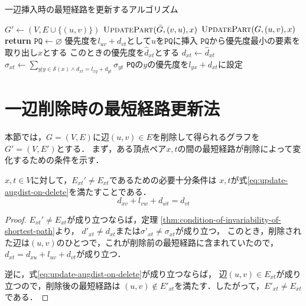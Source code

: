\begin{algorithm}[tbp]
  \caption{一辺挿入時の最短経路を更新するアルゴリズム}
  \label{alg:incremental-algorithm}
  \begin{multicols}{2}
    \begin{algorithmic}[1]\small
      \State $G'\gets (V,E\cup\{(u,v)\})$
      \State $\textproc{UpdatePart}(\bar{G},(v,u),x)$
      \EndFor
      \State $\textproc{UpdatePart}(G,(u,v),x)$
      \EndFor
      \EndProcedure
      \vfill\null
      \columnbreak
      \State \textbf{return}
      \EndIf
      \State $\texttt{PQ}\gets\varnothing$
      \State 優先度を$l_{uv}+d_{vt}$として$u$を$\texttt{PQ}$に挿入
      \State $\texttt{PQ}$から優先度最小の要素を取り出し$x$とする
      \State このときの優先度を$\hat{d}_{xt}$とする
      \State $d_{xt}\gets\hat{d}_{xt}$
      \State $\sigma_{xt}\gets\sum_{y|y\in\mathcal{S}(x)\land d_{xt}=l_{xy}+d_{yt}}\sigma_{yt}$
      \State \texttt{PQ}の$y$の優先度を$l_{yx}+d_{xt}$に設定
      \EndIf
      \EndFor
      \EndWhile
      \EndProcedure
    \end{algorithmic}
  \end{multicols}
\end{algorithm}

\section{一辺削除時の最短経路更新法}
\label{sect:update-apsp-on-delete}
本節では，$G=(V,E)$に辺$(u,v)\in E$を削除して得られるグラフを$G'=(V,E')$とする．
まず，ある頂点ペア$x,t$の間の最短経路が削除によって変化するための条件を示す．

\begin{lemma}
  \label{lmm:update-augdist-on-delete}
  $x,t\in V$に対して，$E_{xt}'\neq E_{xt}$であるための必要十分条件は
  $x,t$が式\eqref{eq:update-augdist-on-delete}を満たすことである．
  \begin{equation}
    d_{xv}+l_{vw}+d_{wt}=d_{vt}
    \label{eq:update-augdist-on-delete}
  \end{equation}
\end{lemma}
\begin{proof}
  $E_{xt}'\neq E_{xt}$が成り立つならば，定理
  \ref{thm:condition-of-invariability-of-shortest-path}より，
  $d'_{xt}\neq d_{xt}$または$\sigma'_{xt}\neq\sigma_{xt}$が成り立つ，
  このとき，削除された辺は$(u,v)$のひとつで，これが削除前の最短経路に含まれていたので，
  $d_{xt}=d_{xu}+l_{uv}+d_{vt}$が成り立つ．

  逆に，式\eqref{eq:update-augdist-on-delete}が成り立つならば，
  辺$(u,v)\in E_{xt}$が成り立つので，削除後の最短経路は
  $(u,v)\notin E'_{xt}$を満たす．したがって，$E'_{xt}\neq E_{xt}$である．
\end{proof}


